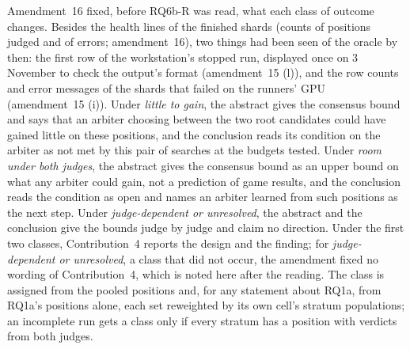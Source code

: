 \documentclass{article}
\begin{document}
Amendment~16 fixed, before RQ6b-R was read, what each class of outcome changes. Besides the health lines of the finished shards (counts of positions judged and of errors; amendment~16), two things had been seen of the oracle by then: the first row of the workstation's stopped run, displayed once on 3 November to check the output's format (amendment~15 (l)), and the row counts and error messages of the shards that failed on the runners' GPU (amendment~15 (i)). Under \emph{little to gain}, the abstract gives the consensus bound and says that an arbiter choosing between the two root candidates could have gained little on these positions, and the conclusion reads its condition on the arbiter as not met by this pair of searches at the budgets tested. Under \emph{room under both judges}, the abstract gives the consensus bound as an upper bound on what any arbiter could gain, not a prediction of game results, and the conclusion reads the condition as open and names an arbiter learned from such positions as the next step. Under \emph{judge-dependent or unresolved}, the abstract and the conclusion give the bounds judge by judge and claim no direction. Under the first two classes, Contribution~4 reports the design and the finding; for \emph{judge-dependent or unresolved}, a class that did not occur, the amendment fixed no wording of Contribution~4, which is noted here after the reading. The class is assigned from the pooled positions and, for any statement about RQ1a, from RQ1a's positions alone, each set reweighted by its own cell's stratum populations; an incomplete run gets a class only if every stratum has a position with verdicts from both judges.
\end{document}
